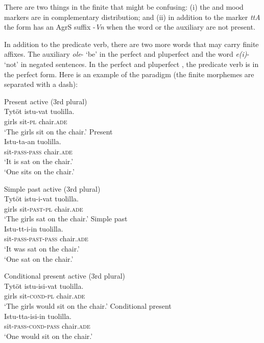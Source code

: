\documentclass[output=paper]{langsci/langscibook}
\begin{document}
There are two things in the  finite  that might be confusing: (i) the  and mood markers are in complementary distribution; and (ii) in addition to the  marker \textit{ttA} the  form has an AgrS suffix -\textit{Vn} when the  word or the auxiliary are not present. 

In addition to the predicate verb, there are two more words that may carry finite affixes. The auxiliary \textit{ole}{}- ‘be’ in the perfect and pluperfect  and the  word \textit{e(i)}{}- ‘not’ in negated sentences. In the perfect and pluperfect , the predicate verb is in the perfect  form. Here is an example of the paradigm (the finite morphemes are separated with a dash):

\newpage 
\ea\label{ex:nikanne:paradigm1}
\ea Present active (3rd  plural)\\
\gll  Tytöt istu-vat tuolilla. \\
girls sit-\textsc{pl} chair.\textsc{ade}\\
\glt  ‘The girls sit on the chair.’
\ex Present \\
\gll  Istu-ta-an tuolilla. \\
sit-\textsc{pass}-\textsc{pass} chair.\textsc{ade}\\
\glt ‘It is sat on the chair.'\\
     ‘One sits on the chair.'\\
\z
\z

\ea\label{ex:nikanne:paradigm2}
\ea Simple past active (3rd  plural)\\
\gll  Tytöt istu-i-vat tuolilla. \\
girls sit-\textsc{past}-\textsc{pl} chair.\textsc{ade}\\
\glt ‘The girls sat on the chair.'
\ex Simple past \\
\gll  Istu-tt-i-in tuolilla. \\
sit-\textsc{pass}-\textsc{past}-\textsc{pass} chair.\textsc{ade}\\
\glt ‘It was sat on the chair.’\\
 ‘One sat on the chair.'\\
\z
\z

\ea\label{ex:nikanne:paragidm3}
\ea Conditional present active (3rd  plural)\\
\gll  Tytöt istu-isi-vat tuolilla. \\
girls sit-\textsc{cond}-\textsc{pl} chair.\textsc{ade}\\
\glt ‘The girls would sit on the chair.’
\ex Conditional present \\
\gll  Istu-tta-isi-in tuolilla. \\
 sit-\textsc{pass}-\textsc{cond}-\textsc{pass} chair.\textsc{ade}\\
\glt  ‘One would sit on the chair.’\\
\z
\z
\end{document}
